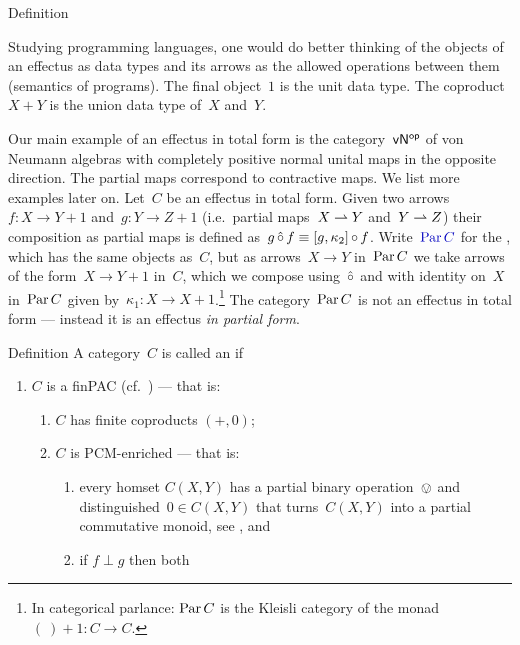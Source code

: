 \documentclass[b]{subfiles}
\begin{document}
\begin{parsec}
\begin{point}{Definition}
\begin{point}
Studying programming languages, one would do better thinking of
    the objects of an effectus as data types and
    its arrows as the allowed operations between them (semantics of programs).
The final object~$1$ is the unit data type.
The coproduct~$X + Y$ is the union data type of~$X$ and~$Y$.
\end{point}
\begin{point}%
Our main example of an effectus in total form
    is the category~${\mathsf{vN}}{^{\mathsf{op}}}$
    of von Neumann algebras with completely positive normal unital
    maps in the opposite direction.
The partial maps correspond to contractive maps.
We list more examples later on.
Let~$C$ be an effectus in total form.
Given two arrows~$f\colon X \to Y+1$
and~$g \colon Y \to Z+1$ (i.e.~partial maps~$X \rightharpoonup Y$ and~$Y \rightharpoonup Z$)
    their composition as partial maps
    is defined as~$g \mathop{\hat\circ} f \equiv  [g, \kappa_2] \mathop{\circ} f$.
Write~$\Define{\Par C}$ for the ,
    which has the same objects
    as~$C$, but as arrows~$X \to Y$ in~$\operatorname{Par} C$
    we take arrows of the form~$X \to Y+1$ in~$C$,
    which we compose using~$\mathop{\hat\circ}$
    and with identity on~$X$ in~$\operatorname{Par} C$
    given by~$\kappa_1 \colon X \to X+1$.\footnote{In categorical
            parlance: $\operatorname{Par} C$ is the Kleisli category of
            the monad~$(\ )+1\colon C \to C$.}
The category~$\operatorname{Par} C$ is not an effectus in total form --- instead it
    is an effectus \emph{in partial form}.
\end{point}
\end{point}
\begin{point}{Definition}%
A category~$C$ is called an 
    \cite{effintro,kentapartial} if
\begin{enumerate}
\item
    $C$ is a finPAC \cite{kentapartial} (cf.~\cite{arbib}) --- that is:
    \begin{enumerate}
        \item 
            $C$ has finite coproducts $(+,0)$;
        \item $C$ is PCM-enriched --- that is:
            \begin{enumerate}
            \item
            every homset $C(X,Y)$ has a partial binary operation~$\ovee$
                    and distinguished~$0 \in C(X,Y)$
                    that turns~$C(X,Y)$ into a partial commutative monoid,
                    see , and
            \item
            if $f \perp g$ then both

\end{enumerate}
\end{enumerate}
\end{enumerate}
\end{point}
\end{parsec}
\end{document}
